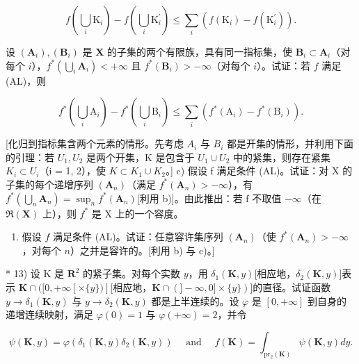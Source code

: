 \[
f \left(\bigcup_ {i} \mathrm{K} _ {i}\right) - f \left(\bigcup_ {i} \mathrm{K} _ {i} ^ {\prime}\right) \leqslant \sum_ {i} \left(f \left(\mathrm{K} _ {i}\right) - f \left(\mathrm{K} _ {i} ^ {\prime}\right)\right).
\]

设 \((\mathbf{A}_i), (\mathbf{B}_i)\) 是 \(\mathbf{X}\) 的子集的两个有限族，具有同一指标集，使 \(\mathbf{B}_i \subset \mathbf{A}_i\)（对每个 \(i\)），\(f^* \left( \bigcup_i \mathbf{A}_i \right) < +\infty\) 且 \(f^*(\mathbf{B}_i) > -\infty\)（对每个 \(i\)）。试证：若 \(f\) 满足 (AL)，则

\[
f ^ {*} \left(\bigcup_ {i} \mathrm{A} _ {i}\right) - f ^ {*} \left(\bigcup_ {i} \mathrm{B} _ {i}\right) \leqslant \sum_ {i} \left(f ^ {*} (\mathrm{A} _ {i}) - f ^ {*} (\mathrm{B} _ {i})\right).
\]

{[}化归到指标集含两个元素的情形。先考虑 \(A_{i}\) 与 \(B_{i}\) 都是开集的情形，并利用下面的引理：若 \(U_{1}, U_{2}\) 是两个开集，K 是包含于 \(U_{1} \cup U_{2}\) 中的紧集，则存在紧集 \(K_{i} \subset U_{i}\)（i = 1, 2），使 \(K \subset K_{1} \cup K_{2}\)。{]} c) 假设 f 满足条件 (AL)。试证：对 X 的子集的每个递增序列 \((\mathbf{A}_{n})\)（满足 \(f^{*}(\mathbf{A}_{n}) > -\infty\)），有 \(f^{*}\left(\bigcup_{n} \mathbf{A}_{n}\right) = \sup_{n} f^{*}(\mathbf{A}_{n})\){[}利用 b){]}。由此推出：若 f 不取值 \(-\infty\)（在 \(\Re(\mathbf{X})\) 上），则 \(f^{*}\) 是 X 上的一个容度。

\begin{enumerate}
\def\labelenumi{\alph{enumi})}
\setcounter{enumi}{3}
\tightlist
\item
  假设 \(f\) 满足条件 (AL)。试证：任意容许集序列 \((\mathbf{A}_n)\)（使 \(f^*(\mathbf{A}_n) > -\infty\)，对每个 \(n\)）之并是容许的。{[}利用 b) 与 c)。{]}
\end{enumerate}

* 13) 设 K 是 \(\mathbf{R}^2\) 的紧子集。对每个实数 \(y\)，用 \(\delta_1(\mathbf{K}, y)\){[}相应地，\(\delta_2(\mathbf{K}, y)\){]}表示 \(\mathbf{K} \cap ([0, +\infty [\times \{y\})]\){[}相应地，\(\mathbf{K} \cap (]-\infty, 0] \times \{y\})\){]}的直径。试证函数 \(y \to \delta_1(\mathbf{K}, y)\) 与 \(y \to \delta_2(\mathbf{K}, y)\) 都是上半连续的。设 \(\varphi\) 是 \([0, +\infty]\) 到自身的递增连续映射，满足 \(\varphi(0) = 1\) 与 \(\varphi(+\infty) = 2\)，并令

\[
\psi (\mathbf {K}, y) = \varphi (\delta_ {1} (\mathbf {K}, y) \delta_ {2} (\mathbf {K}, y)) \quad \text { and } \quad f (\mathbf {K}) = \int_ {\mathrm{pr} _ {2} (\mathbf {K})} \psi (\mathbf {K}, y) d y.
\]

